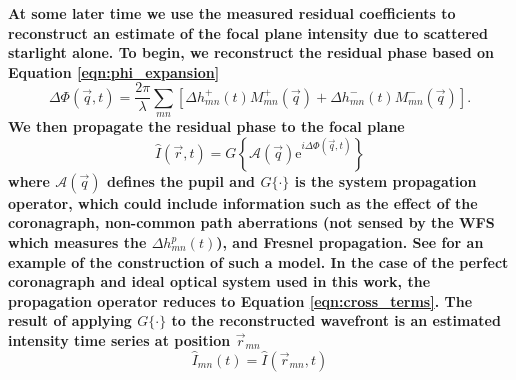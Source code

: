 \documentclass[10pt,preprint]{aastex631}
\begin{document}
\textbf{At some later time we use the measured residual coefficients to reconstruct an estimate of the focal plane intensity due to scattered starlight alone.  To begin, we reconstruct the residual phase based on Equation \ref{eqn:phi_expansion} }
\begin{equation}
\Delta\Phi(\vec{q},t) = \frac{2\pi}{\lambda} \sum\limits_{mn} \left[ \Delta h_{mn}^{+}(t) M_{mn}^{+}(\vec{q}) + \Delta h_{mn}^{-}(t) M_{mn}^{-}(\vec{q})\right].
\label{eqn:phi_residual}
\end{equation}
\textbf{We then propagate the residual phase to the focal plane}
\begin{equation}
\hat{I}(\vec{r},t) = G \left\{\mathcal{A}(\vec{q}) \mbox{e}^{i\Delta\Phi(\vec{q},t)} \right\}
\end{equation}
\textbf{where $\mathcal{A}(\vec{q})$ defines the pupil and $G\{\cdot\}$ is the system propagation operator, which could include information such as the effect of the coronagraph, non-common path aberrations (not sensed by the WFS which measures the $\Delta h_{mn}^{p}(t)$), and Fresnel propagation.  See \citet{2017MNRAS.467L.105H} for an example of the construction of such a model. In the case of the perfect coronagraph and ideal optical system used in this work, the propagation operator reduces to Equation \ref{eqn:cross_terms}. The result of applying $G\{\cdot\}$ to the reconstructed wavefront is an estimated intensity time series at position $\vec{r}_{mn}$ }
\begin{equation}
\hat{I}_{mn}(t) = \hat{I}(\vec{r}_{mn},t)
\end{equation}
\end{document}
